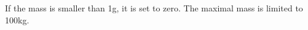 
\begin{DoxyRefList}
\item[\label{bug__bug000001}%
\hypertarget{bug__bug000001}{}%
Member \hyperlink{class_qwt_abstract_slider_a305b137fe4dd80cba307fe1b4bd46272}{Qwt\-Abstract\-Slider\-:\-:set\-Mass} (double val)]If the mass is smaller than 1g, it is set to zero. The maximal mass is limited to 100kg. 
\end{DoxyRefList}